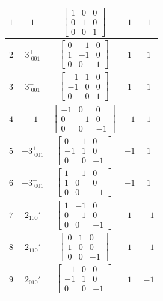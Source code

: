 \documentclass[fleqn,8pt]{jsarticle}
\begin{document}
\begin{longtable}{ccccc}
$ 1 $ & $ 1 $ & $ \begin{bmatrix} 1 & 0 & 0 \\ 0 & 1 & 0 \\ 0 & 0 & 1 \end{bmatrix} $ & $ 1 $ & $ 1 $ \\ \hline
$ 2 $ & $ 3^{+}_{\,\,001} $ & $ \begin{bmatrix} 0 & -1 & 0 \\ 1 & -1 & 0 \\ 0 & 0 & 1 \end{bmatrix} $ & $ 1 $ & $ 1 $ \\ \hline
$ 3 $ & $ 3^{-}_{\,\,001} $ & $ \begin{bmatrix} -1 & 1 & 0 \\ -1 & 0 & 0 \\ 0 & 0 & 1 \end{bmatrix} $ & $ 1 $ & $ 1 $ \\ \hline
$ 4 $ & $ -1 $ & $ \begin{bmatrix} -1 & 0 & 0 \\ 0 & -1 & 0 \\ 0 & 0 & -1 \end{bmatrix} $ & $ -1 $ & $ 1 $ \\ \hline
$ 5 $ & $ -3^{+}_{\,\,001} $ & $ \begin{bmatrix} 0 & 1 & 0 \\ -1 & 1 & 0 \\ 0 & 0 & -1 \end{bmatrix} $ & $ -1 $ & $ 1 $ \\ \hline
$ 6 $ & $ -3^{-}_{\,\,001} $ & $ \begin{bmatrix} 1 & -1 & 0 \\ 1 & 0 & 0 \\ 0 & 0 & -1 \end{bmatrix} $ & $ -1 $ & $ 1 $ \\ \hline
$ 7 $ & $ 2{}_{100}{}' $ & $ \begin{bmatrix} 1 & -1 & 0 \\ 0 & -1 & 0 \\ 0 & 0 & -1 \end{bmatrix} $ & $ 1 $ & $ -1 $ \\ \hline
$ 8 $ & $ 2{}_{110}{}' $ & $ \begin{bmatrix} 0 & 1 & 0 \\ 1 & 0 & 0 \\ 0 & 0 & -1 \end{bmatrix} $ & $ 1 $ & $ -1 $ \\ \hline
$ 9 $ & $ 2{}_{010}{}' $ & $ \begin{bmatrix} -1 & 0 & 0 \\ -1 & 1 & 0 \\ 0 & 0 & -1 \end{bmatrix} $ & $ 1 $ & $ -1 $ \\ \hline

\end{longtable}
\end{document}

